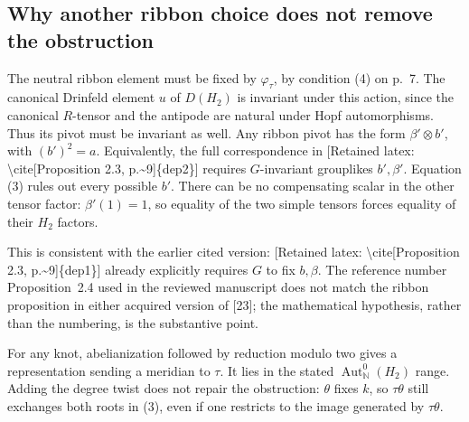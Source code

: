 \documentclass[10pt]{article}
\begin{document}
\subsection*{Why another ribbon choice does not remove the obstruction}
The neutral ribbon element must be fixed by \(\varphi_\tau\), by condition (4) on p. 7. The canonical Drinfeld element \(u\) of \(D(H_2)\) is invariant under this action, since the canonical \(R\)-tensor and the antipode are natural under Hopf automorphisms. Thus its pivot must be invariant as well. Any ribbon pivot has the form \(\beta'\otimes b'\), with \((b')^2=a\). Equivalently, the full correspondence in [Retained latex: \textbackslash{}cite[Proposition 2.3, p.\textasciitilde{}9]\{dep2\}] requires \(G\)-invariant grouplikes \(b',\beta'\). Equation (3) rules out every possible \(b'\). There can be no compensating scalar in the other tensor factor: \(\beta'(1)=1\), so equality of the two simple tensors forces equality of their \(H_2\) factors.\par
This is consistent with the earlier cited version: [Retained latex: \textbackslash{}cite[Proposition 2.3, p.\textasciitilde{}9]\{dep1\}] already explicitly requires \(G\) to fix \(b,\beta\). The reference number Proposition 2.4 used in the reviewed manuscript does not match the ribbon proposition in either acquired version of [23]; the mathematical hypothesis, rather than the numbering, is the substantive point.\par
For any knot, abelianization followed by reduction modulo two gives a representation sending a meridian to \(\tau\). It lies in the stated \(\operatorname{Aut}^0_\mathbb N(H_2)\) range. Adding the degree twist does not repair the obstruction: \(\theta\) fixes \(k\), so \(\tau\theta\) still exchanges both roots in (3), even if one restricts to the image generated by \(\tau\theta\).\par
\end{document}

